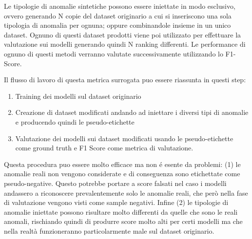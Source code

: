 Le tipologie di anomalie sintetiche possono essere iniettate in modo esclusivo, ovvero generando N copie del dataset originario a cui si inseriscono una sola tipologia di anomalia per ognuna; oppure combinandole insieme in un unico dataset. 
Ognuno di questi dataset prodotti viene poi utilizzato per effettuare la valutazione sui modelli generando quindi N ranking differenti. Le performance di ognuno di questi metodi verranno valutate successivamente utilizzando lo F1-Score.

Il flusso di lavoro di questa metrica surrogata puo essere riassunta in questi step:
\begin{enumerate}
	\item Training dei modelli sul dataset originario
	\item Creazione di dataset modificati andando ad iniettare i diversi tipi di anomalie e producendo quindi le pseudo-etichette
	\item Valutazione dei modelli sui dataset modificati usando le pseudo-etichette come ground truth e F1 Score come metrica di valutazione.
\end{enumerate}


Questa procedura puo essere molto efficace ma non é esente da problemi: (1) le anomalie reali non vengono considerate e di conseguenza sono etichettate come pseudo-negative. Questo potrebbe portare a score falsati nel caso i modelli andassero a riconoscere prevalentemente solo le anomalie reali, che però nella fase di valutazione vengono visti come sample negativi. Infine (2) le tipologie di anomalie iniettate possono risultare molto differenti da quelle che sono le reali anomali, rischiando quindi di produrre score molto alti per certi modelli ma che nella realtà funzioneranno particolarmente male sul dataset originario.

